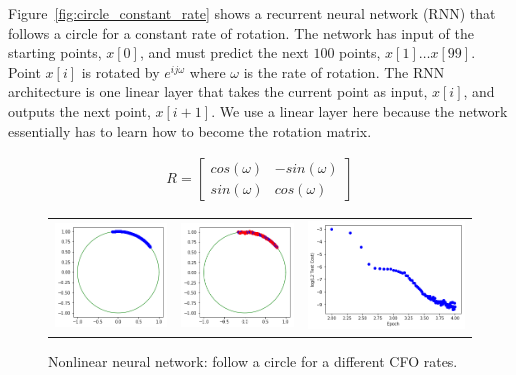 Figure~\ref{fig:circle_constant_rate} shows a recurrent neural network (RNN) that follows a circle for a constant rate of rotation.  The network has input of the starting points, $x[0]$, and must predict the next $100$ points, $x[1] \ldots x[99]$.  Point $x[i]$ is rotated by $e^{ij\omega}$ where $\omega$ is the rate of rotation.  The RNN architecture is one linear layer that takes the current point as input, $x[i]$, and outputs the next point, $x[i+1]$.  We use a linear layer here because the network essentially has to learn how to become the rotation matrix.

\begin{align}
R = \begin{bmatrix}
cos(\omega) & - sin(\omega) \\
sin(\omega) & cos(\omega)
\end{bmatrix}
\end{align} 



\setlength{\tabcolsep}{0pt}
\begin{figure}
  \centering
  \caption{Nonlinear neural network: follow a circle for a different CFO rates.}
  \begin{tabular}{ccc}
    \includegraphics[width=50mm]{figures/follow_circle_nonlinear_before.png}&
    \includegraphics[width=50mm]{figures/follow_circle_nonlinear_after.png}&
    \includegraphics[width=70mm]{figures/follow_circle_nonlinear_loss.png}\\
  \end{tabular}
  \label{fig:circle_diff_rate}
\end{figure}

